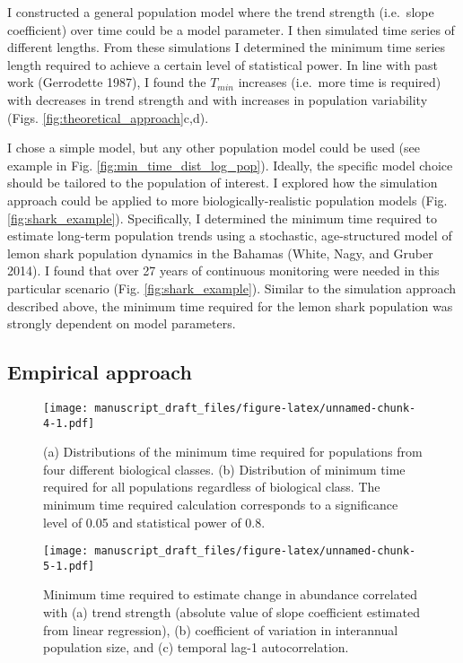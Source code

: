 \documentclass[12pt,]{article}
\begin{document}
\begin{spacing}{2}
I constructed a general population model where the trend strength
(i.e.~slope coefficient) over time could be a model parameter. I then
simulated time series of different lengths. From these simulations I
determined the minimum time series length required to achieve a certain
level of statistical power. In line with past work (Gerrodette 1987), I
found the \(T_{min}\) increases (i.e.~more time is required) with
decreases in trend strength and with increases in population variability
(Figs. \ref{fig:theoretical_approach}c,d).

I chose a simple model, but any other population model could be used
(see example in Fig. \ref{fig:min_time_dist_log_pop}). Ideally, the
specific model choice should be tailored to the population of interest.
I explored how the simulation approach could be applied to more
biologically-realistic population models (Fig. \ref{fig:shark_example}).
Specifically, I determined the minimum time required to estimate
long-term population trends using a stochastic, age-structured model of
lemon shark population dynamics in the Bahamas (White, Nagy, and Gruber
2014). I found that over 27 years of continuous monitoring were needed
in this particular scenario (Fig. \ref{fig:shark_example}). Similar to
the simulation approach described above, the minimum time required for
the lemon shark population was strongly dependent on model parameters.

\subsection{Empirical approach}\label{empirical-approach-1}

\begin{figure}[htbp]
\centering
\texttt{[image: manuscript\_draft\_files/figure-latex/unnamed-chunk-4-1.pdf]}
\caption{(a) Distributions of the minimum time required for populations
from four different biological classes. (b) Distribution of minimum time
required for all populations regardless of biological class. The minimum
time required calculation corresponds to a significance level of 0.05
and statistical power of 0.8.\label{fig:min_time_dist}}
\end{figure}

\begin{figure}[htbp]
\centering
\texttt{[image: manuscript\_draft\_files/figure-latex/unnamed-chunk-5-1.pdf]}
\caption{Minimum time required to estimate change in abundance
correlated with (a) trend strength (absolute value of slope coefficient
estimated from linear regression), (b) coefficient of variation in
interannual population size, and (c) temporal lag-1
autocorrelation.\label{fig:correlates}}
\end{figure}


\end{spacing}
\end{document}
